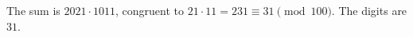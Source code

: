 The sum is $2021\cdot1011$, congruent to $21\cdot11=231\equiv31\pmod{100}$. The digits are $\boxed{31}$.
